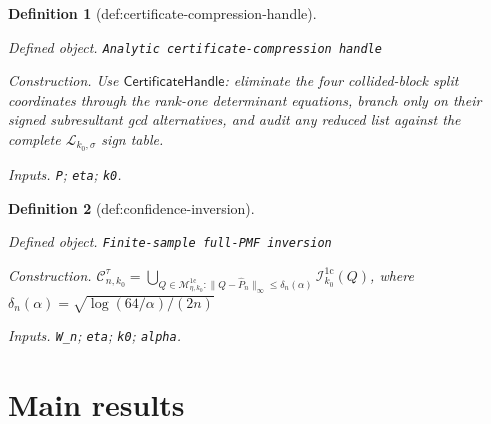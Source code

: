 \documentclass{article}
\newtheorem{definition}{Definition}
\begin{document}
\begin{definition}[def:certificate-compression-handle]\label{def:certificate-compression-handle}
\par\smallskip\noindent\emph{Defined object.} \texttt{Analytic certificate-\allowbreak{}compression handle}
\par\smallskip\noindent\emph{Construction.} Use \(\mathsf{CertificateHandle}\): eliminate the four collided-block split coordinates through the rank-one determinant equations, branch only on their signed subresultant gcd alternatives, and audit any reduced list against the complete \(\mathscr L_{k_0,\sigma}\) sign table.
\par\smallskip\noindent\emph{Inputs.} \texttt{P}; \texttt{eta}; \texttt{k0}.
\end{definition}

\begin{definition}[def:confidence-inversion]\label{def:confidence-inversion}
\par\smallskip\noindent\emph{Defined object.} \texttt{Finite-\allowbreak{}sample full-\allowbreak{}PMF inversion}
\par\smallskip\noindent\emph{Construction.} \(\mathcal C_{n,k_0}^{\tau}=\bigcup_{Q\in\mathcal M_{\eta,k_0}^{1\mathrm c}:\lVert Q-\widehat P_n\rVert_\infty\le\delta_n(\alpha)}\mathcal I_{k_0}^{1\mathrm c}(Q)\), where \(\delta_n(\alpha)=\sqrt{\log(64/\alpha)/(2n)}\)
\par\smallskip\noindent\emph{Inputs.} \texttt{W\_\allowbreak{}n}; \texttt{eta}; \texttt{k0}; \texttt{alpha}.
\end{definition}

\section{Main results}
\end{document}

